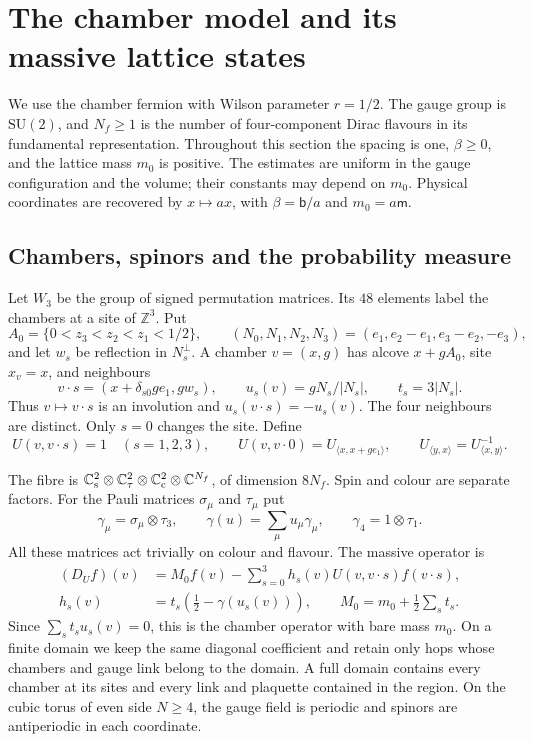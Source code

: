 \documentclass[11pt,letterpaper,reqno]{amsart}
\theoremstyle{definition}
\theoremstyle{remark}
\begin{document}
\section{The chamber model and its massive lattice states}
\label{sec:qcd-lattice-foundation}

We use the chamber fermion with Wilson parameter $r=1/2$.
The gauge group is $\mathrm{SU}(2)$, and $N_f\ge1$ is the number
of four-component Dirac flavours in its fundamental representation.
Throughout this section the spacing is one, $\beta\ge0$, and the
lattice mass $m_0$ is positive. The estimates are uniform in the
gauge configuration and the volume; their constants may depend on
$m_0$. Physical coordinates are recovered by $x\mapsto ax$, with
$\beta=\mathsf b/a$ and $m_0=a\mathsf m$.

\subsection{Chambers, spinors and the probability measure}

Let $W_3$ be the group of signed permutation matrices. Its $48$
elements label the chambers at a site of $\mathbb Z^3$.
Put
\[
 A_0=\{0<z_3<z_2<z_1<1/2\},\qquad
 (N_0,N_1,N_2,N_3)=(e_1,e_2-e_1,e_3-e_2,-e_3),
\]
and let $w_s$ be reflection in $N_s^\perp$. A chamber $v=(x,g)$
has alcove $x+gA_0$, site $x_v=x$, and neighbours
\begin{equation}\label{C-391-6}
 v\cdot s=(x+\delta_{s0}ge_1,gw_s),\qquad
 u_s(v)=gN_s/|N_s|,\qquad t_s=3|N_s|.
\end{equation}
Thus $v\mapsto v\cdot s$ is an involution and
$u_s(v\cdot s)=-u_s(v)$. The four neighbours are distinct.
Only $s=0$ changes the site. Define
\[
 U(v,v\cdot s)=1\quad(s=1,2,3),\qquad
 U(v,v\cdot0)=U_{\langle x,x+ge_1\rangle},\qquad
 U_{\langle y,x\rangle}=U_{\langle x,y\rangle}^{-1}.
\]

The fibre is
$\mathbb C^2_{\rm s}\otimes\mathbb C^2_\tau
 \otimes\mathbb C^2_{\rm c}\otimes\mathbb C^{N_f}$,
of dimension $8N_f$. Spin and colour are separate factors.
For the Pauli matrices $\sigma_\mu$ and $\tau_\mu$ put
\[
 \gamma_\mu=\sigma_\mu\otimes\tau_3,\qquad
 \gamma(u)=\sum_\mu u_\mu\gamma_\mu,\qquad
 \gamma_4=1\otimes\tau_1.
\]
All these matrices act trivially on colour and flavour. The massive
operator is
\begin{equation}\label{C-391-10}
 \begin{aligned}
 (D_Uf)(v)&=M_0f(v)-\sum_{s=0}^3h_s(v)U(v,v\cdot s)f(v\cdot s),\\
 h_s(v)&=t_s(\tfrac12-\gamma(u_s(v))),\qquad
 M_0=m_0+\tfrac12\sum_st_s.
 \end{aligned}
\end{equation}
Since $\sum_st_su_s(v)=0$, this is the chamber operator with
bare mass $m_0$. On a finite domain we keep the same diagonal
coefficient and retain only hops whose chambers and gauge link
belong to the domain. A full domain contains every chamber at its
sites and every link and plaquette contained in the region.
On the cubic torus of even side $N\ge4$, the gauge field is
periodic and spinors are antiperiodic in each coordinate.
\end{document}
